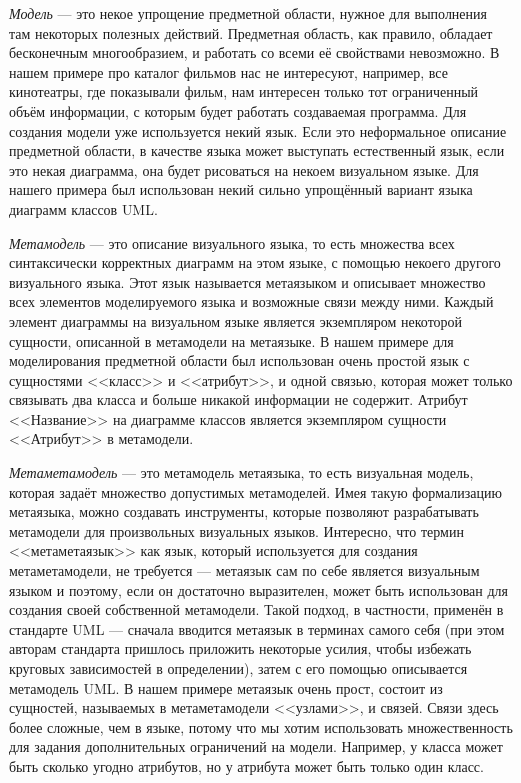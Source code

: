 \textit{Модель} --- это некое упрощение предметной области, нужное для выполнения там 
некоторых полезных действий. Предметная область, как правило, обладает 
бесконечным многообразием, и работать со всеми её свойствами невозможно. 
В нашем примере про каталог фильмов нас не интересуют, например, все кинотеатры, 
где показывали фильм, нам интересен только тот ограниченный объём информации,
с которым будет работать создаваемая программа. Для создания модели уже 
используется некий язык. Если это неформальное описание предметной области, в 
качестве языка может выступать естественный язык, если это некая диаграмма, она 
будет рисоваться на некоем визуальном языке. Для нашего примера был использован 
некий сильно упрощённый вариант языка диаграмм классов \ac{UML}.

\textit{Метамодель} --- это описание визуального языка, то есть множества всех 
синтаксически корректных диаграмм на этом языке, с помощью некоего другого 
визуального языка. Этот язык называется метаязыком и описывает множество всех 
элементов моделируемого языка и возможные связи между ними. Каждый элемент 
диаграммы на визуальном языке является экземпляром некоторой сущности, описанной 
в метамодели на метаязыке. В нашем примере для моделирования предметной области 
был использован очень простой язык с сущностями <<класс>> и <<атрибут>>, и одной 
связью, которая может только связывать два класса и больше никакой информации 
не содержит. Атрибут <<Название>> на диаграмме классов является экземпляром 
сущности <<Атрибут>> в метамодели.

\textit{Метаметамодель} --- это метамодель метаязыка, то есть визуальная модель, 
которая задаёт множество допустимых метамоделей. Имея такую формализацию 
метаязыка, можно создавать инструменты, которые позволяют разрабатывать 
метамодели для произвольных визуальных языков. Интересно, что термин 
<<метаметаязык>> как язык, который используется для создания метаметамодели, 
не требуется --- метаязык сам по себе является визуальным языком и поэтому, 
если он достаточно выразителен, может быть использован для создания своей 
собственной метамодели. Такой подход, в частности, применён в стандарте \ac{UML} 
--- сначала вводится метаязык в терминах самого себя (при этом авторам стандарта 
пришлось приложить некоторые усилия, чтобы избежать круговых зависимостей в 
определении), затем с его помощью описывается метамодель \ac{UML}. В нашем примере 
метаязык очень прост, состоит из сущностей, называемых в метаметамодели 
<<узлами>>, и связей. Связи здесь более сложные, чем в языке, потому что мы 
хотим использовать множественность для задания дополнительных ограничений на 
модели. Например, у класса может быть сколько угодно атрибутов, но у атрибута 
может быть только один класс.

